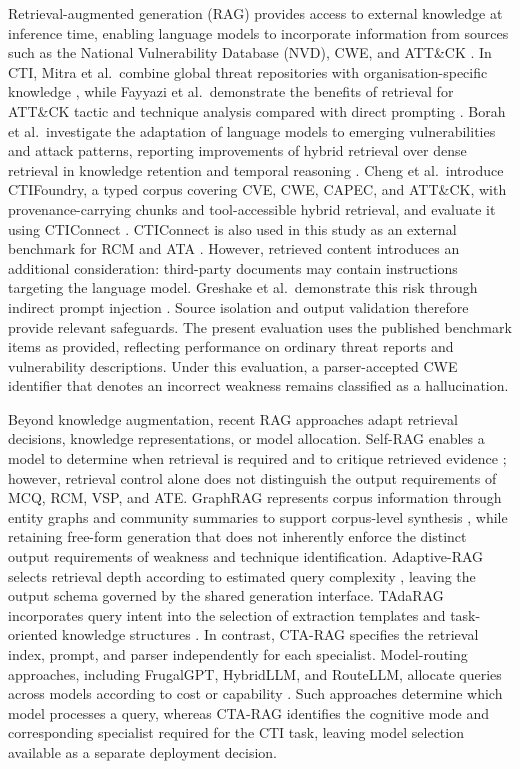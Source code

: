 \documentclass[5p,times,authoryear]{elsarticle}
\begin{document}
Retrieval-augmented generation (RAG) provides access to external knowledge at inference time, enabling language models to incorporate information from sources such as the National Vulnerability Database (NVD), CWE, and ATT\&CK \citep{lewis2020rag,karpukhin2020dense,izacard2021fid}. In CTI, Mitra et al.\ combine global threat repositories with organisation-specific knowledge \citep{mitra2024localintel}, while Fayyazi et al.\ demonstrate the benefits of retrieval for ATT\&CK tactic and technique analysis compared with direct prompting \citep{fayyazi2024ttp}. Borah et al.\ investigate the adaptation of language models to emerging vulnerabilities and attack patterns, reporting improvements of hybrid retrieval over dense retrieval in knowledge retention and temporal reasoning \citep{borah2025adapting}. Cheng et al.\ introduce CTIFoundry, a typed corpus covering CVE, CWE, CAPEC, and ATT\&CK, with provenance-carrying chunks and tool-accessible hybrid retrieval, and evaluate it using CTIConnect \citep{ctifoundry2026}. CTIConnect is also used in this study as an external benchmark for RCM and ATA \citep{cheng2026cticonnect}. However, retrieved content introduces an additional consideration: third-party documents may contain instructions targeting the language model. Greshake et al.\ demonstrate this risk through indirect prompt injection \citep{greshake2023injection}. Source isolation and output validation therefore provide relevant safeguards. The present evaluation uses the published benchmark items as provided, reflecting performance on ordinary threat reports and vulnerability descriptions. Under this evaluation, a parser-accepted CWE identifier that denotes an incorrect weakness remains classified as a hallucination.

Beyond knowledge augmentation, recent RAG approaches adapt retrieval decisions, knowledge representations, or model allocation. Self-RAG enables a model to determine when retrieval is required and to critique retrieved evidence \citep{asai2023selfrag}; however, retrieval control alone does not distinguish the output requirements of MCQ, RCM, VSP, and ATE. GraphRAG represents corpus information through entity graphs and community summaries to support corpus-level synthesis \citep{edge2024graphrag}, while retaining free-form generation that does not inherently enforce the distinct output requirements of weakness and technique identification. Adaptive-RAG selects retrieval depth according to estimated query complexity \citep{jeong2024adaptive}, leaving the output schema governed by the shared generation interface. TAdaRAG incorporates query intent into the selection of extraction templates and task-oriented knowledge structures \citep{zhang2026tadarag}. In contrast, CTA-RAG specifies the retrieval index, prompt, and parser independently for each specialist. Model-routing approaches, including FrugalGPT, HybridLLM, and RouteLLM, allocate queries across models according to cost or capability \citep{chen2023frugalgpt,ding2024hybridllm,ong2024routellm}. Such approaches determine which model processes a query, whereas CTA-RAG identifies the cognitive mode and corresponding specialist required for the CTI task, leaving model selection available as a separate deployment decision.
\end{document}
